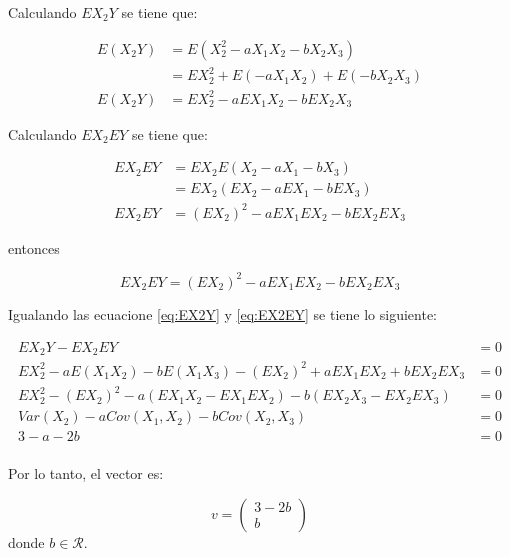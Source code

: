 \begin{enumerate}
          Calculando $EX_2Y$ se tiene que:

          \begin{align}
              E(X_2Y) & = E(X_2^2-aX_1X_2-bX_2X_3)       \nonumber       \\
                      & = EX_2^2+E(-aX_1X_2)+E(-bX_2X_3) \nonumber       \\
              E(X_2Y) & = EX_2^2-aEX_1X_2-bEX_2X_3       \label{eq:EX2Y}
          \end{align}

          Calculando $EX_2EY$ se tiene que:


          \begin{align*}
              EX_2EY & = EX_2 E(X_2-aX_1-bX_3)           \\
                     & =EX_2( EX_2-aEX_1-bEX_3)          \\
              EX_2EY & = (EX_2)^2 -aEX_1EX_2 - bEX_2EX_3
          \end{align*}

          entonces

          \begin{equation}
              EX_2EY  = (EX_2)^2 -aEX_1EX_2 - bEX_2EX_3 \label{eq:EX2EY}
          \end{equation}

          Igualando las ecuacione \ref{eq:EX2Y} y \ref{eq:EX2EY} se tiene lo siguiente:

          \begin{align*}
              EX_2Y                     - EX_2EY                            & =0  \\
              EX_2^2-aE(X_1X_2)-bE(X_1X_3) -(EX_2)^2 +aEX_1EX_2 + bEX_2EX_3 & = 0 \\
              EX_2^2 -(EX_2)^2 -a (EX_1X_2-EX_1EX_2) - b(EX_2X_3-EX_2EX_3)  & =0  \\
              Var(X_2)        - aCov(X_1,X_2) - bCov(X_2,X_3)               & =0  \\
              3 - a - 2b                                                    & =0  \\
          \end{align*}

          Por lo tanto, el vector es:

          \begin{equation*}
              v = \begin{pmatrix}
                  3-2b \\
                  b
              \end{pmatrix}
          \end{equation*}
          donde $b\in \mathcal{R}$.
\end{enumerate}